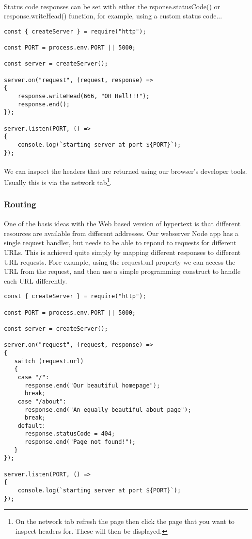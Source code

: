 \documentclass[10pt, a4paper, twosize]{article}
\begin{document}
\paragraph{} Status code responses can be set with either the rsponse.statusCode() or response.writeHead() function, for example, using a custom status code...

\begin{lstlisting}
const { createServer } = require("http");

const PORT = process.env.PORT || 5000;

const server = createServer();

server.on("request", (request, response) => 
{
    response.writeHead(666, "OH Hell!!!");
    response.end();
});

server.listen(PORT, () => 
{
    console.log(`starting server at port ${PORT}`);
});
\end{lstlisting}

\paragraph{} We can inspect the headers that are returned using our browser's developer tools. Usually this is via the network tab\footnote{On the network tab refresh the page then click the page that you want to inspect headers for. These will then be displayed.}.



\subsubsection{Routing}
\paragraph{} One of the basis ideas with the Web based version of hypertext is that different resources are available from different addresses. Our webserver Node app has a single request handler, but needs to be able to repond to requests for different URLs. This is achieved quite simply by mapping different responses to different URL requests. Fore example, using the request.url property we can access the URL from the request, and then use a simple programming construct to handle each URL differently.

\begin{lstlisting}
const { createServer } = require("http");

const PORT = process.env.PORT || 5000;

const server = createServer();

server.on("request", (request, response) => 
{
   switch (request.url) 
   {
    case "/":
      response.end("Our beautiful homepage");
      break;
    case "/about":
      response.end("An equally beautiful about page");
      break;
    default:
      response.statusCode = 404;
      response.end("Page not found!");
   }
});

server.listen(PORT, () => 
{
    console.log(`starting server at port ${PORT}`);
});
\end{lstlisting}
\end{document}
